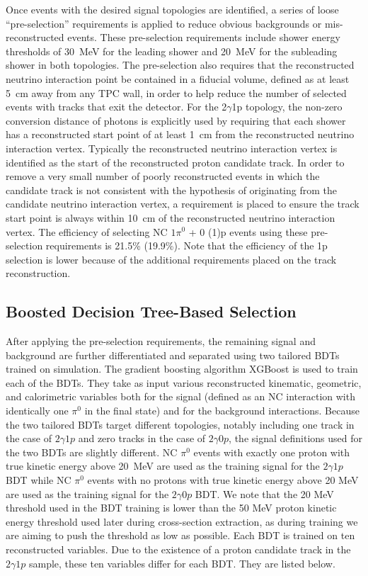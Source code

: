 Once events with the desired signal topologies are identified, a series of loose ``pre-selection'' requirements is applied to reduce obvious backgrounds or mis-reconstructed events. These pre-selection requirements include shower energy thresholds of 30~MeV for the leading shower and 20~MeV for the subleading shower in both topologies. The pre-selection also requires that the reconstructed neutrino interaction point be contained in a fiducial volume, defined as at least 5~cm away from any TPC wall, in order to help reduce the number of selected events with tracks that exit the detector. For the 2$\gamma$1p topology, the non-zero conversion distance of photons is explicitly used by requiring that each shower has a reconstructed start point of at least 1~cm from the reconstructed neutrino interaction vertex. Typically the reconstructed neutrino interaction vertex is identified as the start of the reconstructed proton candidate track. In order to remove a very small number of poorly reconstructed events in which the candidate track is not consistent with the hypothesis of originating from the candidate neutrino interaction vertex, a requirement is placed to ensure the track start point is always within 10~cm of the reconstructed neutrino interaction vertex. The efficiency of selecting NC $1\pi^0$ + 0 (1)p events using these pre-selection requirements is 21.5\% (19.9\%). Note that the efficiency of the 1p selection is lower because of the additional requirements placed on the track reconstruction. 

\subsection{Boosted Decision Tree-Based Selection}
After applying the pre-selection requirements, the remaining signal and background are further differentiated and separated using two tailored BDTs trained on simulation. The gradient boosting algorithm XGBoost \cite{Chen:2016:XST:2939672.2939785} is used to train each of the BDTs. They take as input various reconstructed kinematic, geometric, and calorimetric variables both for the signal (defined as an NC interaction with identically one $\pi^0$ in the final state) and for the background interactions. Because the two tailored BDTs target different topologies, notably including one track in the case of $2\gamma1p$ and zero tracks in the case of $2\gamma0p$, the signal definitions used for the two BDTs are slightly different. NC $\pi^0$ events with exactly one proton with true kinetic energy above 20~MeV are used as the training signal for the $2\gamma1p$ BDT while NC $\pi^0$ events with no protons with true kinetic energy above 20 MeV are used as the training signal for the $2\gamma0p$ BDT. We note that the 20 MeV threshold used in the BDT training is lower than the 50 MeV proton kinetic energy threshold used later during cross-section extraction, as during training we are aiming to push the threshold as low as possible. Each BDT is trained on ten reconstructed variables. Due to the existence of a proton candidate track in the $2\gamma1p$ sample, these ten variables differ for each BDT. They are listed below.\\

